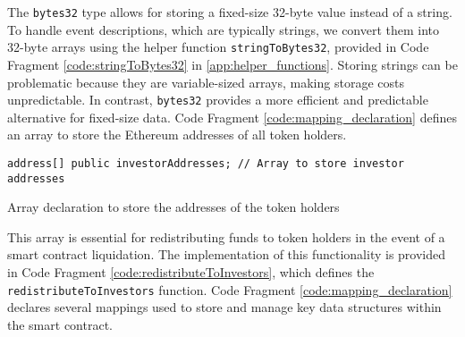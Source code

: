 \documentclass[10pt]{article}
\begin{document}
The \texttt{bytes32} type allows for storing a fixed-size 32-byte value instead of a string. To handle event descriptions, which are typically strings, we convert them into 32-byte arrays using the helper function \texttt{stringToBytes32}, provided in Code Fragment \ref{code:stringToBytes32} in \cref{app:helper_functions}. Storing strings can be problematic because they are variable-sized arrays, making storage costs unpredictable. In contrast, \texttt{bytes32} provides a more efficient and predictable alternative for fixed-size data. Code Fragment \ref{code:mapping_declaration} defines an array to store the Ethereum addresses of all token holders.

\begin{codefragment}[!h]
\begin{lstlisting}[language=Solidity]
    address[] public investorAddresses; // Array to store investor addresses
\end{lstlisting}
    \caption{Array declaration to store the addresses of the token holders}
    \label{code:array_declaration}
\end{codefragment}

This array is essential for redistributing funds to token holders in the event of a smart contract liquidation. The implementation of this functionality is provided in Code Fragment \ref{code:redistributeToInvestors}, which defines the \texttt{redistributeToInvestors} function. Code Fragment \ref{code:mapping_declaration} declares several mappings used to store and manage key data structures within the smart contract.
\end{document}

